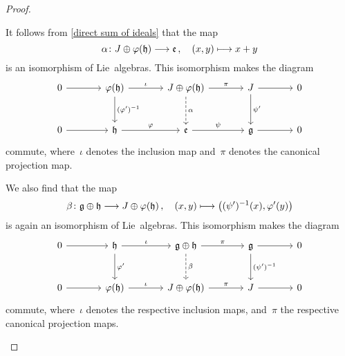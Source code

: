 \begin{proof}
\begin{implicationlist}
			It follows from \cref{direct sum of ideals} that the map
			\[
				\alpha
				\colon
				J \oplus \varphi(\hlie)
				\to
				\elie \,,
				\quad
				(x, y)
				\mapsto
				x + y
			\]
			is an isomorphism of Lie~algebras.
			This isomorphism makes the diagram
			\[
				\begin{tikzcd}[sep = large]
					0
					\arrow{r}
					&
					\varphi(\hlie)
					\arrow{r}[above]{\iota}
					\arrow{d}[right]{(\varphi')^{-1}}
					&
					J \oplus \varphi(\hlie)
					\arrow{r}[above]{\pi}
					\arrow[dashed]{d}[right]{\alpha}
					&
					J
					\arrow{r}
					\arrow{d}[right]{\psi'}
					&
					0
					\\
					0
					\arrow{r}
					&
					\hlie
					\arrow{r}[above]{\varphi}
					&
					\elie
					\arrow{r}[above]{\psi}
					&
					\glie
					\arrow{r}
					&
					0
				\end{tikzcd}
			\]
			commute, where~$\iota$ denotes the inclusion map and~$\pi$ denotes the canonical projection map.

			We also find that the map
			\[
				\beta
				\colon
				\glie \oplus \hlie
				\to
				J \oplus \varphi(\hlie) \,,
				\quad
				(x,y)
				\mapsto
				\bigl( (\psi')^{-1}(x) , \varphi'(y) \bigr)
			\]
			is again an isomorphism of Lie~algebras.
			This isomorphism makes the diagram
			\[
				\begin{tikzcd}[sep = large]
					0
					\arrow{r}
					&
					\hlie
					\arrow{r}[above]{\iota}
					\arrow{d}[right]{\varphi'}
					&
					\glie \oplus \hlie
					\arrow{r}[above]{\pi}
					\arrow[dashed]{d}[right]{\beta}
					&
					\glie
					\arrow{r}
					\arrow{d}[right]{(\psi')^{-1}}
					&
					0
					\\
					0
					\arrow{r}
					&
					\varphi(\hlie)
					\arrow{r}[above]{\iota}
					&
					J \oplus \varphi(\hlie)
					\arrow{r}[above]{\pi}
					&
					J
					\arrow{r}
					&
					0
				\end{tikzcd}
			\]
			commute, where~$\iota$ denotes the respective inclusion maps, and~$\pi$ the respective canonical projection maps.


\end{implicationlist}
\end{proof}
